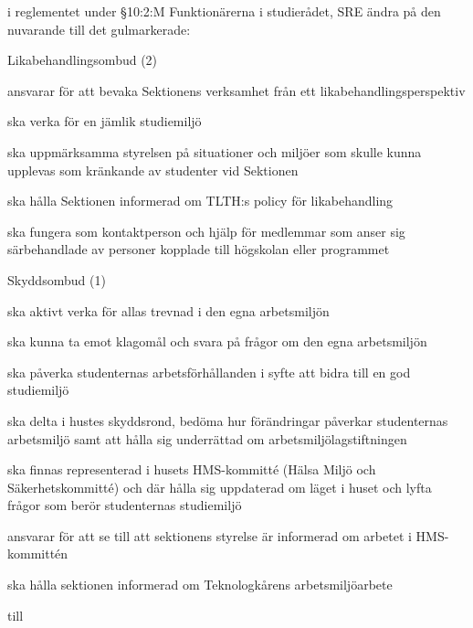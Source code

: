 \documentclass[../_main/handlingar.tex]{subfiles}
\begin{document}
\begin{attsatser}
  \att i reglementet under \S10:2:M Funktionärerna i studierådet, SRE ändra på den
  nuvarande till det gulmarkerade:

  Likabehandlingsombud (2)
  \begin{dashlist}
      \item ansvarar för att bevaka Sektionens verksamhet från ett likabehandlingsperspektiv
      \item ska verka för en jämlik studiemiljö
      \item ska uppmärksamma styrelsen på situationer och miljöer som skulle kunna upplevas som kränkande av studenter vid Sektionen
      \item ska hålla Sektionen informerad om TLTH:s policy för likabehandling
      \item ska fungera som kontaktperson och hjälp för medlemmar som anser sig särbehandlade av personer kopplade till högskolan eller programmet
  \end{dashlist}
  Skyddsombud (1)
      \begin{dashlist}
          \item ska aktivt verka för allas trevnad i den egna arbetsmiljön
          \item ska kunna ta emot klagomål och svara på frågor om den egna arbetsmiljön
          \item ska påverka studenternas arbetsförhållanden i syfte att bidra till en god studiemiljö
          \item ska delta i hustes skyddsrond, bedöma hur förändringar påverkar studenternas arbetsmiljö samt att
hålla sig underrättad om arbetsmiljölagstiftningen
    \item ska finnas representerad i husets HMS-kommitté (Hälsa Miljö och Säkerhetskommitté) och där hålla
sig uppdaterad om läget i huset och lyfta frågor som berör studenternas studiemiljö
    \item ansvarar för att se till att sektionens styrelse är informerad om arbetet i HMS-kommittén
    \item ska hålla sektionen informerad om Teknologkårens arbetsmiljöarbete
      \end{dashlist}

      till


\end{attsatser}
\end{document}
